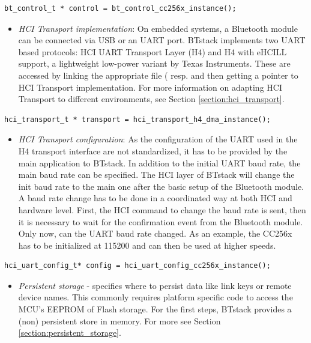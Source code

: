 \documentclass[a4paper,titlepage,oneside,12pt]{amsart} %
\begin{document}
\begin{lstlisting}
bt_control_t * control = bt_control_cc256x_instance();
\end{lstlisting}

\begin{itemize}
\item \emph{HCI Transport implementation}: On embedded systems, a Bluetooth module can be connected via USB or an UART port. BTstack implements two UART based protocols: HCI UART Transport Layer (H4) and H4 with eHCILL support, a lightweight low-power variant by Texas Instruments.
These are accessed by linking the appropriate file ( resp.  and then getting a pointer to HCI Transport implementation. For more information on adapting HCI Transport to different environments, see Section \ref{section:hci_transport}.
\end{itemize}

\begin{lstlisting}
hci_transport_t * transport = hci_transport_h4_dma_instance();
\end{lstlisting}

\begin{itemize}
\item \emph {HCI Transport configuration}: As the configuration of the UART used in the H4 transport interface are not standardized, it has to be provided by the main application to BTstack. In addition to the initial UART baud rate, the main baud rate can be specified. The HCI layer of BTstack will change the init baud rate to the main one after the basic setup of the Bluetooth module. A baud rate change has to be done in a coordinated way at both HCI and hardware level. First, the HCI command to change the baud rate is sent, then it is necessary to wait for the confirmation event from the Bluetooth module. Only now, can the UART baud rate changed. As an example, the CC256x has to be initialized at 115200 and can then be used at higher speeds.
\end{itemize}

\begin{lstlisting}
hci_uart_config_t* config = hci_uart_config_cc256x_instance();
\end{lstlisting}

\begin{itemize}
\item \emph {Persistent storage} - specifies where to persist data like link keys or remote device names. This commonly requires platform specific code to access the MCU's EEPROM of Flash storage. For the first steps, BTstack provides a (non) persistent store in memory. For more see Section \ref{section:persistent_storage}.
\end{itemize}
\end{document}
